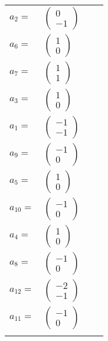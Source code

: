 \documentclass[1p]{elsarticle_modified}
\theoremstyle{definition}
\begin{document}
\begin{tabular}{m{7pt} m{180pt} m{7pt} m{180pt} }
\flushright $a_{2}=$&$\begin{pmatrix}0\\-1\end{pmatrix}$ \\
\flushright $a_{6}=$&$\begin{pmatrix}1\\0\end{pmatrix}$ \\
\flushright $a_{7}=$&$\begin{pmatrix}1\\1\end{pmatrix}$ \\
\flushright $a_{3}=$&$\begin{pmatrix}1\\0\end{pmatrix}$ \\
\flushright $a_{1}=$&$\begin{pmatrix}-1\\-1\end{pmatrix}$ \\
\flushright $a_{9}=$&$\begin{pmatrix}-1\\0\end{pmatrix}$ \\
\flushright $a_{5}=$&$\begin{pmatrix}1\\0\end{pmatrix}$ \\
\flushright $a_{10}=$&$\begin{pmatrix}-1\\0\end{pmatrix}$ \\
\flushright $a_{4}=$&$\begin{pmatrix}1\\0\end{pmatrix}$ \\
\flushright $a_{8}=$&$\begin{pmatrix}-1\\0\end{pmatrix}$ \\
\flushright $a_{12}=$&$\begin{pmatrix}-2\\-1\end{pmatrix}$ \\
\flushright $a_{11}=$&$\begin{pmatrix}-1\\0\end{pmatrix}$\\&\end{tabular}
\end{document}
